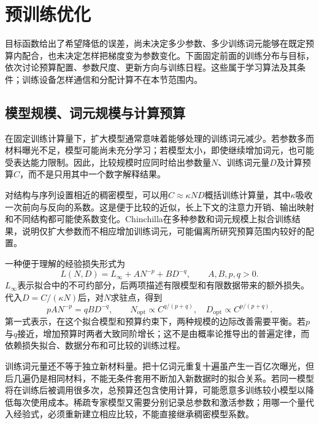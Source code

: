 \section{预训练优化}
\label{sec:nlp-llm-optimization}

目标函数给出了希望降低的误差，尚未决定多少参数、多少训练词元能够在既定预算内配合，也未决定怎样把梯度变为参数变化。下面固定前面的训练分布与目标，依次讨论预算配置、参数尺度、更新方向与训练日程。这些属于学习算法及其条件；训练设备怎样通信和分配计算不在本节范围内。

\subsection{模型规模、词元规模与计算预算}
\label{sec:nlp-llm-compute-allocation}

在固定训练计算量下，扩大模型通常意味着能够处理的训练词元减少。若参数多而材料曝光不足，模型可能尚未充分学习；若模型太小，即使继续增加词元，也可能受表达能力限制。因此，比较规模时应同时给出参数量$N$、训练词元量$D$及计算预算$C$，而不是只用其中一个数字解释结果。

对结构与序列设置相近的稠密模型，可以用$C\approx\kappa ND$概括训练计算量，其中$\kappa$吸收一次前向与反向的系数。这是便于比较的近似，长上下文的注意力开销、输出映射和不同结构都可能使系数变化。Chinchilla在多种参数和词元规模上拟合训练结果，说明仅扩大参数而不相应增加训练词元，可能偏离所研究预算范围内较好的配置。

一种便于理解的经验损失形式为
\begin{equation}
 L(N,D)=L_{\infty}+A N^{-p}+B D^{-q},
 \qquad A,B,p,q>0.
 \label{eq:nlp-llm-scaling-loss}
\end{equation}
$L_{\infty}$表示拟合中的不可约部分，后两项描述有限模型和有限数据带来的额外损失。代入$D=C/(\kappa N)$后，对$N$求驻点，得到
\begin{equation}
 pA N^{-p}=qB D^{-q},\qquad
 N_{\mathrm{opt}}\propto C^{q/(p+q)},\quad
 D_{\mathrm{opt}}\propto C^{p/(p+q)}.
 \label{eq:nlp-llm-scaling-allocation}
\end{equation}
第一式表示，在这个拟合模型和预算约束下，两种规模的边际改善需要平衡。若$p$与$q$接近，增加预算时两者大致同阶增长；这不是由概率论推导出的普遍定律，而依赖损失拟合、数据分布和可比较的训练过程。

训练词元量还不等于独立新材料量。把十亿词元重复十遍虽产生一百亿次曝光，但后几遍仍是相同材料，不能无条件套用不断加入新数据时的拟合关系。若同一模型将在训练后被调用很多次，总预算还包含使用计算，可能愿意多训练较小模型以降低每次使用成本。稀疏专家模型又需要分别记录总参数和激活参数；用哪一个量代入经验式，必须重新建立相应比较，不能直接继承稠密模型系数。

